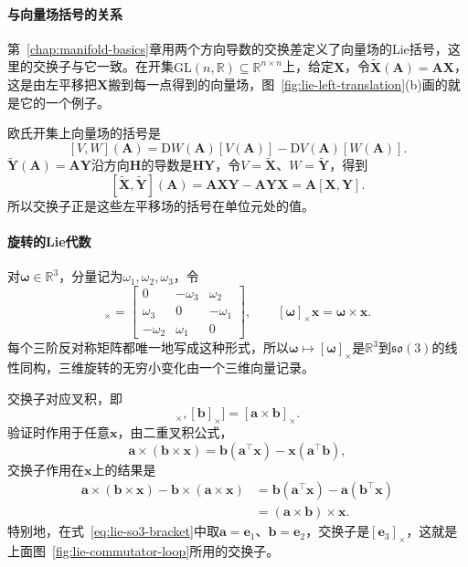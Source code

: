 \paragraph{与向量场括号的关系}
第~\ref{chap:manifold-basics}章用两个方向导数的交换差定义了向量场的Lie括号，这里的交换子与它一致。在开集$\mathrm{GL}(n,\mathbb R)\subseteq\mathbb R^{n\times n}$上，给定$\bm X$，令$\widetilde{\bm X}(\bm A)=\bm A\bm X$，这是由左平移把$\bm X$搬到每一点得到的向量场，图~\ref{fig:lie-left-translation}(b)画的就是它的一个例子。

欧氏开集上向量场的括号是
\[
[V,W](\bm A)=\mathrm DW(\bm A)[V(\bm A)]-\mathrm DV(\bm A)[W(\bm A)].
\]
$\widetilde{\bm Y}(\bm A)=\bm A\bm Y$沿方向$\bm H$的导数是$\bm H\bm Y$，令$V=\widetilde{\bm X}$、$W=\widetilde{\bm Y}$，得到
\[
[\widetilde{\bm X},\widetilde{\bm Y}](\bm A)
=\bm A\bm X\bm Y-\bm A\bm Y\bm X=\bm A[\bm X,\bm Y].
\]
所以交换子正是这些左平移场的括号在单位元处的值。

\paragraph{旋转的Lie代数}
对$\bm\omega\in\mathbb R^3$，分量记为$\omega_1,\omega_2,\omega_3$，令
\begin{equation}
 [\bm\omega]_\times=\begin{bmatrix}0&-\omega_3&\omega_2\\\omega_3&0&-\omega_1\\-\omega_2&\omega_1&0\end{bmatrix},
 \qquad [\bm\omega]_\times\bm x=\bm\omega\times\bm x.
 \label{eq:lie-hat-map}
\end{equation}
每个三阶反对称矩阵都唯一地写成这种形式，所以$\bm\omega\mapsto[\bm\omega]_\times$是$\mathbb R^3$到$\mathfrak{so}(3)$的线性同构，三维旋转的无穷小变化由一个三维向量记录。

交换子对应叉积，即
\begin{equation}
 [[\bm a]_\times,[\bm b]_\times]=[\bm a\times\bm b]_\times .
 \label{eq:lie-so3-bracket}
\end{equation}
验证时作用于任意$\bm x$，由二重叉积公式，
\[
\bm a\times(\bm b\times\bm x)=\bm b(\bm a^\top\bm x)-\bm x(\bm a^\top\bm b),
\]
交换子作用在$\bm x$上的结果是
\[
\begin{aligned}
\bm a\times(\bm b\times\bm x)-\bm b\times(\bm a\times\bm x)
&=\bm b(\bm a^\top\bm x)-\bm a(\bm b^\top\bm x)\\
&=(\bm a\times\bm b)\times\bm x.
\end{aligned}
\]
特别地，在式~\eqref{eq:lie-so3-bracket}中取$\bm a=\bm e_1$、$\bm b=\bm e_2$，交换子是$[\bm e_3]_\times$，这就是上面图~\ref{fig:lie-commutator-loop}所用的交换子。

